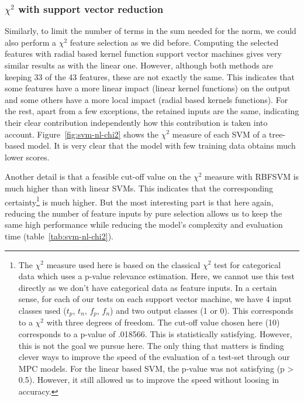 \subsubsection{$\chi^2$ with support vector reduction}
Similarly, to limit the number of terms in the sum needed for the norm, we could also perform a $\chi^2$ feature selection as we did before. Computing the selected features with radial based kernel function support vector machines gives very similar results as with the linear one. However, although both methods are keeping 33 of the 43 features, these are not exactly the same. This indicates that some features have a more linear impact (linear kernel functions) on the output and some others have a more local impact (radial based kernels functions). For the rest, apart from a few exceptions, the retained inputs are the same, indicating their clear contribution independently how this contribution is taken into account. Figure~\ref{fig:svm-nl-chi2} shows the $\chi^2$ measure of each SVM of a tree-based model. It is very clear that the model with few training data obtains much lower scores.

Another detail is that a feasible cut-off value on the $\chi^2$ measure with RBFSVM is much higher than with linear SVMs. This indicates that the corresponding certainty\footnote{The $\chi^2$ measure used here is based on the classical $\chi^2$ test for categorical data which uses a p-value relevance estimation. Here, we cannot use this test directly as we don't have categorical data as feature inputs. In a certain sense, for each of our tests on each support vector machine, we have 4 input classes used ($t_p$, $t_n$, $f_p$, $f_n$) and two output classes (1 or 0). This corresponds to a $\chi^2$ with three degrees of freedom. The cut-off value chosen here (10) corresponds to a p-value of .018566. This is statistically satisfying. However, this is not the goal we pursue here. The only thing that matters is finding clever ways to improve the speed of the evaluation of a test-set through our MPC models. For the linear based SVM, the p-value was not satisfying (p > 0.5). However, it still allowed us to improve the speed without loosing in accuracy.} is much higher. But the most interesting part is that here again, reducing the number of feature inputs by pure selection allows us to keep the same high performance while reducing the model's complexity and evaluation time (table~\ref{tab:svm-nl-chi2}).

